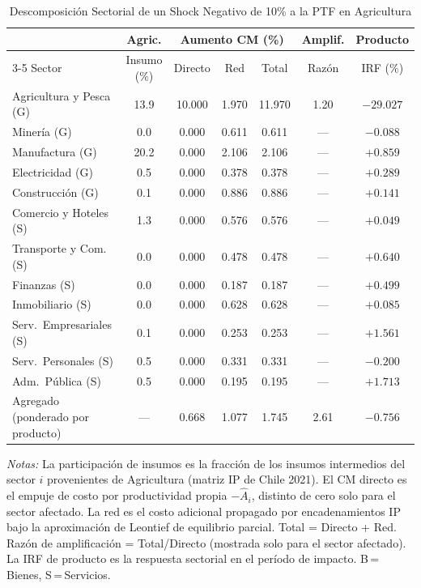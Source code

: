 \begin{table}[htbp]
\centering
\caption{Descomposición Sectorial de un Shock Negativo de 10\% a la PTF en Agricultura}
\label{tab:agr_decomp}
\begin{threeparttable}
\small
\begin{tabular}{@{}l c c c c c c@{}}
\toprule
 & Agric. & \multicolumn{3}{c}{Aumento CM (\%)} & Amplif. & Producto \\
\cmidrule(lr){3-5}
Sector & Insumo (\%) & Directo & Red & Total & Razón & IRF (\%) \\
\midrule
Agricultura y Pesca (G) & 13.9 & 10.000 & 1.970 & 11.970 &  1.20 & $-29.027$ \\
Minería (G) &  0.0 & 0.000 & 0.611 & 0.611 & --- & $-0.088$ \\
Manufactura (G) & 20.2 & 0.000 & 2.106 & 2.106 & --- & $+0.859$ \\
Electricidad (G) &  0.5 & 0.000 & 0.378 & 0.378 & --- & $+0.289$ \\
Construcción (G) &  0.1 & 0.000 & 0.886 & 0.886 & --- & $+0.141$ \\
Comercio y Hoteles (S) &  1.3 & 0.000 & 0.576 & 0.576 & --- & $+0.049$ \\
Transporte y Com. (S) &  0.0 & 0.000 & 0.478 & 0.478 & --- & $+0.640$ \\
Finanzas (S) &  0.0 & 0.000 & 0.187 & 0.187 & --- & $+0.499$ \\
Inmobiliario (S) &  0.0 & 0.000 & 0.628 & 0.628 & --- & $+0.085$ \\
Serv.\ Empresariales (S) &  0.1 & 0.000 & 0.253 & 0.253 & --- & $+1.561$ \\
Serv.\ Personales (S) &  0.5 & 0.000 & 0.331 & 0.331 & --- & $-0.200$ \\
Adm.\ Pública (S) &  0.5 & 0.000 & 0.195 & 0.195 & --- & $+1.713$ \\
\midrule
Agregado (ponderado por producto) & --- & 0.668 & 1.077 & 1.745 &  2.61 & $-0.756$ \\
\bottomrule
\end{tabular}
\begin{tablenotes}[flushleft]
\footnotesize
\item \textit{Notas:} La participación de insumos es la fracción de los insumos intermedios del sector $i$ provenientes de Agricultura (matriz IP de Chile 2021). El CM directo es el empuje de costo por productividad propia $-\hat A_i$, distinto de cero solo para el sector afectado. La red es el costo adicional propagado por encadenamientos IP bajo la aproximación de Leontief de equilibrio parcial. Total = Directo + Red. Razón de amplificación = Total/Directo (mostrada solo para el sector afectado). La IRF de producto es la respuesta sectorial en el período de impacto. B\,=\,Bienes, S\,=\,Servicios.
\end{tablenotes}
\end{threeparttable}
\end{table}
